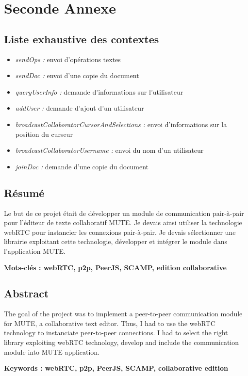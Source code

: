 \documentclass{tnreport}
\begin{document}
\cleardoublepage

\chapter{Seconde Annexe}

\section{Liste exhaustive des contextes}
\label{sec:context}

\begin{itemize}
  \item \emph{sendOps : } envoi d'opérations textes
  \item \emph{sendDoc : } envoi d'une copie du document
  \item \emph{queryUserInfo : } demande d'informations sur l'utilisateur
  \item \emph{addUser : } demande d'ajout d'un utilisateur
  \item \emph{broadcastCollaboratorCursorAndSelections : } envoi d'informations sur la position du curseur
  \item \emph{broadcastCollaboratorUsername : } envoi du nom d'un utilisateur
  \item \emph{joinDoc : } demande d'une copie du document
\end{itemize}


\cleardoublepage
\thispagestyle{empty}

\section*{Résumé}

Le but de ce projet était de développer un module de communication pair-à-pair pour l'éditeur de texte collaboratif MUTE. Je devais ainsi utiliser la technologie webRTC pour instancier les connexions pair-à-pair. Je devais sélectionner une librairie exploitant cette technologie, développer  et intégrer le module dans l'application MUTE.

{\bf Mots-clés : webRTC, p2p, PeerJS, SCAMP, edition collaborative}


\section*{Abstract}

The goal of the project was to implement a peer-to-peer communication module for MUTE, a collaborative text editor. Thus, I had to use the webRTC technology to instanciate peer-to-peer connections. I had to select the right library exploiting webRTC technology, develop and include the communication module into MUTE application.

{\bf Keywords : webRTC, p2p, PeerJS, SCAMP, collaborative edition}
\end{document}
